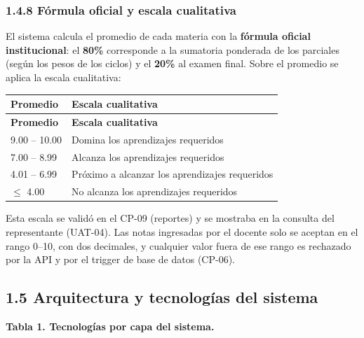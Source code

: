 \documentclass[11pt,a4paper]{article}
\begin{document}
\subsubsection*{1.4.8 Fórmula oficial y escala cualitativa}


El sistema calcula el promedio de cada materia con la \textbf{fórmula oficial institucional}: el \textbf{80\%} corresponde a la sumatoria ponderada de los parciales (según los pesos de los ciclos) y el \textbf{20\%} al examen final. Sobre el promedio se aplica la escala cualitativa:


{\small
\begin{longtable}{|p{}|p{}|}
\rowcolor{UTECblue}\color{white}\bfseries Promedio & \color{white}\bfseries Escala cualitativa \\ \hline
\endfirsthead
\rowcolor{UTECblue}\color{white}\bfseries Promedio & \color{white}\bfseries Escala cualitativa \\ \hline
\endhead
9.00 -- 10.00 & Domina los aprendizajes requeridos \\ \hline
7.00 -- 8.99 & Alcanza los aprendizajes requeridos \\ \hline
4.01 -- 6.99 & Próximo a alcanzar los aprendizajes requeridos \\ \hline
{$\leq$} 4.00 & No alcanza los aprendizajes requeridos \\ \hline
\end{longtable}}


Esta escala se validó en el CP-09 (reportes) y se mostraba en la consulta del representante (UAT-04). Las notas ingresadas por el docente solo se aceptan en el rango 0--10, con dos decimales, y cualquier valor fuera de ese rango es rechazado por la API y por el trigger de base de datos (CP-06).


\subsection*{1.5 Arquitectura y tecnologías del sistema}


\textbf{Tabla 1. Tecnologías por capa del sistema.}
\end{document}
